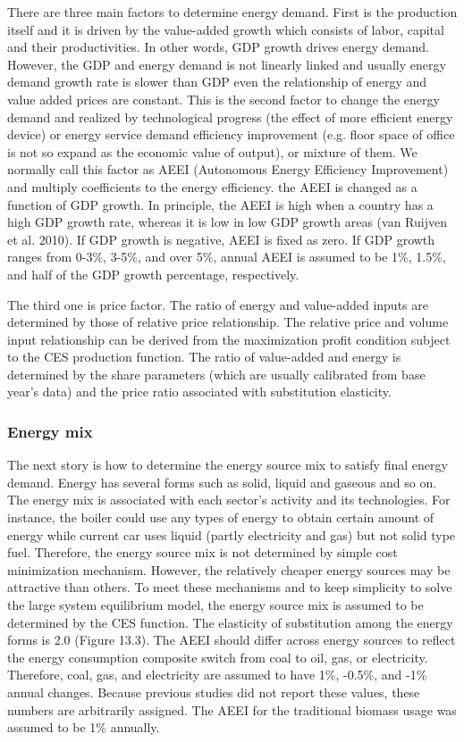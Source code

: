 \documentclass[10pt,a4paper,titlepage,dvipdfmx]{book}
\begin{document}
\begin{itemize}
There are three main factors to determine energy demand. First is the production itself and it is driven by the value-added growth which consists of labor, capital and their productivities. In other words, GDP growth drives energy demand. However, the GDP and energy demand is not linearly linked and usually energy demand growth rate is slower than GDP even the relationship of energy and value added prices are constant. This is the second factor to change the energy demand and realized by technological progress (the effect of more efficient energy device) or energy service demand efficiency improvement (e.g. floor space of office is not so expand as the economic value of output), or mixture of them. We normally call this factor as AEEI (Autonomous Energy Efficiency Improvement) and multiply coefficients to the energy efficiency. the AEEI is changed as a function of GDP growth. In principle, the AEEI is high when a country has a high GDP growth rate, whereas it is low in low GDP growth areas (van Ruijven et al. 2010). If GDP growth is negative, AEEI is fixed as zero. If GDP growth ranges from 0-3\%, 3-5\%, and over 5\%, annual AEEI is assumed to be 1\%, 1.5\%, and half of the GDP growth percentage, respectively. 

The third one is price factor. The ratio of energy and value-added inputs are determined by those of relative price relationship. The relative price and volume input relationship can be derived from the maximization profit condition subject to the CES production function. The ratio of value-added and energy is determined by the share parameters (which are usually calibrated from base year's data) and the price ratio associated with substitution elasticity.

\subsubsection{\label{subsubsec:EneMix}Energy mix}

The next story is how to determine the energy source mix to satisfy final energy demand. Energy has several forms such as solid, liquid and gaseous and so on. The energy mix is associated with each sector's activity and its technologies. For instance, the boiler could use any types of energy to obtain certain amount of energy while current car uses liquid (partly electricity and gas) but not solid type fuel. Therefore, the energy source mix is not determined by simple cost minimization mechanism. However, the relatively cheaper energy sources may be attractive than others. To meet these mechanisms and to keep simplicity to solve the large system equilibrium model, the energy source mix is assumed to be determined by the CES function. The elasticity of substitution among the energy forms is 2.0 (Figure 13.3). The AEEI should differ across energy sources to reflect the energy consumption composite switch from coal to oil, gas, or electricity. Therefore, coal, gas, and electricity are assumed to have 1\%, -0.5\%, and -1\% annual changes. Because previous studies did not report these values, these numbers are arbitrarily assigned. The AEEI for the traditional biomass usage was assumed to be 1\% annually.


\end{itemize}
\end{document}
